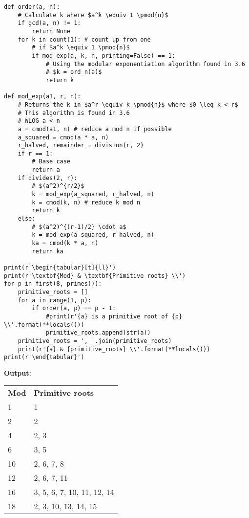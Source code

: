 \begin{verbatim}
def order(a, n):
    # Calculate k where $a^k \equiv 1 \pmod{n}$
    if gcd(a, n) != 1:
        return None
    for k in count(1): # count up from one
        # if $a^k \equiv 1 \pmod{n}$
        if mod_exp(a, k, n, printing=False) == 1:
            # Using the modular exponentiation algorithm found in 3.6
            # $k = ord_n(a)$
            return k

def mod_exp(a1, r, n):
    # Returns the k in $a^r \equiv k \pmod{n}$ where $0 \leq k < r$
    # This algorithm is found in 3.6
    # WLOG a < n
    a = cmod(a1, n) # reduce a mod n if possible
    a_squared = cmod(a * a, n)
    r_halved, remainder = division(r, 2)
    if r == 1:
        # Base case
        return a
    if divides(2, r):
        # $(a^2)^{r/2}$
        k = mod_exp(a_squared, r_halved, n)
        k = cmod(k, n) # reduce k mod n
        return k
    else:
        # $(a^2)^{(r-1)/2} \cdot a$
        k = mod_exp(a_squared, r_halved, n)
        ka = cmod(k * a, n)
        return ka

print(r'\begin{tabular}[t]{ll}')
print(r'\textbf{Mod} & \textbf{Primitive roots} \\')
for p in first(8, primes()):
    primitive_roots = []
    for a in range(1, p):
        if order(a, p) == p - 1:
            #print(r'{a} is a primitive root of {p} \\'.format(**locals()))
            primitive_roots.append(str(a))
    primitive_roots = ', '.join(primitive_roots)
    print(r'{a} & {primitive_roots} \\'.format(**locals()))
print(r'\end{tabular}')
\end{verbatim}

\textbf{Output:}

\begin{tabular}[t]{ll}
\textbf{Mod} & \textbf{Primitive roots} \\
1 & 1 \\
2 & 2 \\
4 & 2, 3 \\
6 & 3, 5 \\
10 & 2, 6, 7, 8 \\
12 & 2, 6, 7, 11 \\
16 & 3, 5, 6, 7, 10, 11, 12, 14 \\
18 & 2, 3, 10, 13, 14, 15 \\
\end{tabular}

